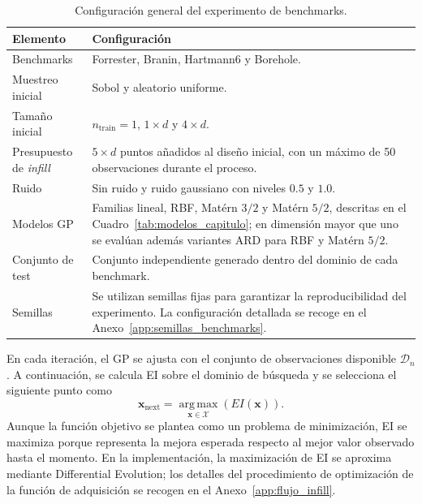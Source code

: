 \begin{table}[htbp]
    \centering
    \caption[Configuración del experimento benchmark]{Configuración general del experimento de benchmarks.}
    \label{tab:configuracion_benchmarks}
    \begin{tabular}{p{4.1cm} p{11.1cm}}
        \toprule
        \textbf{Elemento} & \textbf{Configuración} \\
        \midrule
        Benchmarks 
        & Forrester, Branin, Hartmann6 y Borehole. \\

        Muestreo inicial 
        & Sobol y aleatorio uniforme. \\

        Tamaño inicial 
        & \(n_{\text{train}} = 1\), \(1 \times d\) y \(4 \times d\). \\

        Presupuesto de \emph{infill} 
        & \(5 \times d\) puntos añadidos al diseño inicial, con un máximo de 50 observaciones durante el proceso. \\

        Ruido 
        & Sin ruido y ruido gaussiano con niveles \(0.5\) y \(1.0\). \\

        Modelos GP 
        & Familias lineal, RBF, Matérn \(3/2\) y Matérn \(5/2\), descritas en el Cuadro~\ref{tab:modelos_capitulo}; en dimensión mayor que uno se evalúan además variantes ARD para RBF y Matérn \(5/2\). \\

        Conjunto de test 
        & Conjunto independiente generado dentro del dominio de cada benchmark. \\

        Semillas 
        & Se utilizan semillas fijas para garantizar la reproducibilidad del experimento. La configuración detallada se recoge en el Anexo~\ref{app:semillas_benchmarks}. \\
        \bottomrule
    \end{tabular}
\end{table}
\FloatBarrier

En cada iteración, el GP se ajusta con el conjunto de observaciones disponible \(\mathcal{D}_n\). A continuación, se calcula EI sobre el dominio de búsqueda y se selecciona el siguiente punto como
\[
    \bm{x}_{\mathrm{next}}
    =
    \operatorname*{arg\,max}_{\bm{x}\in\mathcal{X}} (EI(\bm{x})).
\]
Aunque la función objetivo se plantea como un problema de minimización, EI se maximiza porque representa la mejora esperada respecto al mejor valor observado hasta el momento. En la implementación, la maximización de EI se aproxima mediante Differential Evolution; los detalles del procedimiento de optimización de la función de adquisición se recogen en el Anexo~\ref{app:flujo_infill}.

